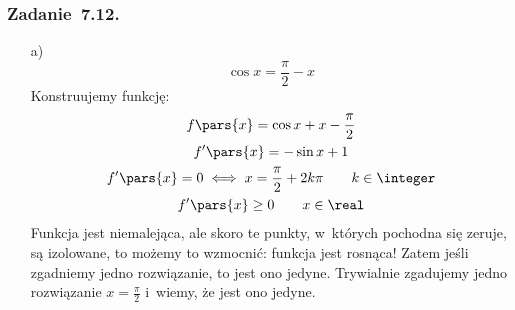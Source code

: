 \subsubsection*{Zadanie~7.12.}
\begin{itemize}
    \item[a)]
        \begin{equation*}
            \cos x = \frac{\pi}{2} - x
        \end{equation*}
        Konstruujemy funkcję:
        \begin{gather*}
            f\pars{x} = \cos x + x - \frac{\pi}{2}\\
            f'\pars{x} = -\sin x + 1\\
            f'\pars{x} = 0 \iff x = \frac{\pi}{2} + 2k\pi \qquad k \in \integer\\
            f'\pars{x} \geq 0 \qquad x \in \real
        \end{gather*}
        Funkcja jest niemalejąca, ale skoro te punkty, w~których pochodna się zeruje, są izolowane, to możemy to wzmocnić: funkcja jest rosnąca! Zatem jeśli zgadniemy jedno rozwiązanie, to jest ono jedyne. Trywialnie zgadujemy jedno rozwiązanie \(x = \frac{\pi}{2}\) i~wiemy, że jest ono jedyne.
\end{itemize}
